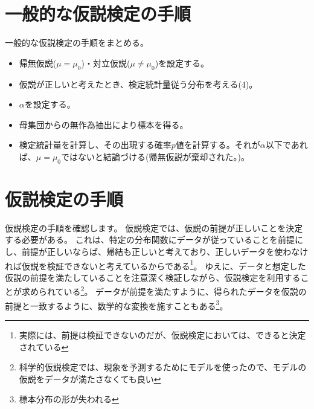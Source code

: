 \section{一般的な仮説検定の手順}
一般的な仮説検定の手順をまとめる。
%
\begin{framed}
    \begin{itemize}
        \item 帰無仮説($\mu = \mu_0$)・対立仮説($\mu\neq \mu_0$)を設定する。
        \item 仮説が正しいと考えたとき、検定統計量従う分布を考える(4)。
        \item $\alpha$を設定する。
        \item 母集団からの無作為抽出により標本を得る。
        \item 検定統計量を計算し、その出現する確率$p$値を計算する。それが$\alpha$以下であれば、$\mu=\mu_0$ではないと結論づける(帰無仮説が棄却された。)。%
    \end{itemize}
\end{framed}
\fi

\section{仮説検定の手順}
仮説検定の手順を確認します。
仮説検定では、仮説の前提が正しいことを決定する必要がある。
これは、特定の分布関数にデータが従っていることを前提にし、前提が正しいならば、帰結も正しいと考えており、正しいデータを使わなければ仮説を検証できないと考えているからである\footnote{実際には、前提は検証できないのだが、仮説検定においては、できると決定されている}。%
ゆえに、データと想定した仮説の前提を満たしていることを注意深く検証しながら、仮説検定を利用することが求められている\footnote{科学的仮説検定では、現象を予測するためにモデルを使ったので、モデルの仮説をデータが満たさなくても良い}。
データが前提を満たすように、得られたデータを仮説の前提と一致するように、数学的な変換を施すこともある\footnote{標本分布の形が失われる}。

